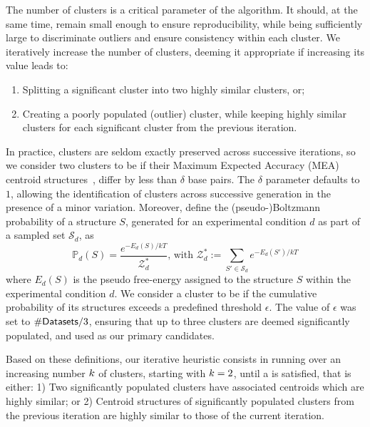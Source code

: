 \documentclass[a4,center,fleqn]{NAR}
\begin{document}
The number of clusters is a critical parameter of the \CL{} algorithm. It should, at the same time, remain small enough to ensure reproducibility, while being sufficiently large to discriminate outliers and ensure consistency within each cluster. We iteratively increase the number of clusters, deeming it appropriate if increasing its value leads to:
\begin{enumerate} 
	\item Splitting a significant cluster into two highly similar clusters, or; 
	\item Creating a poorly populated (outlier) cluster, while keeping highly similar clusters for each significant cluster from the previous iteration.
\end{enumerate} 
In practice, clusters are seldom exactly preserved across successive iterations, so we consider two clusters to be  if their Maximum Expected Accuracy (MEA) centroid structures~\citep{Lu2009}, differ by less than $\delta$ base pairs.
The $\delta$ parameter defaults to $1$, allowing the identification of clusters across successive generation in the presence of a minor variation.
Moreover, define the (pseudo-)Boltzmann probability of a structure $S$, generated for an experimental condition $d$ as part of a sampled set $\mathcal{S}_d$, as
\[\mathbb{P}_d(S) = \frac{e^{-E_d(S)/kT}}{\mathcal{Z}^*_d} \text{, with } \mathcal{Z}^*_d := \sum_{S'\in \mathcal{S}_d} e^{-E_d(S')/kT}\]
where $E_d(S)$ is the pseudo free-energy assigned to the structure $S$ within the experimental condition $d$.
We consider a cluster to be  if the cumulative probability of its structures exceeds a predefined threshold $\epsilon$. 
The value of $\epsilon$ was set to $\#{\sf Datasets}/3$, ensuring that up to three clusters are deemed significantly populated, and used as our primary candidates.

Based on these definitions, our iterative heuristic consists in running \CL over an increasing number $k$ of clusters, starting with $k=2$, until a  is satisfied, that is either: 1) Two significantly populated clusters have associated centroids which are highly similar; or 2) Centroid structures of significantly populated clusters from the previous iteration are highly similar to those of the current iteration.
\end{document}
